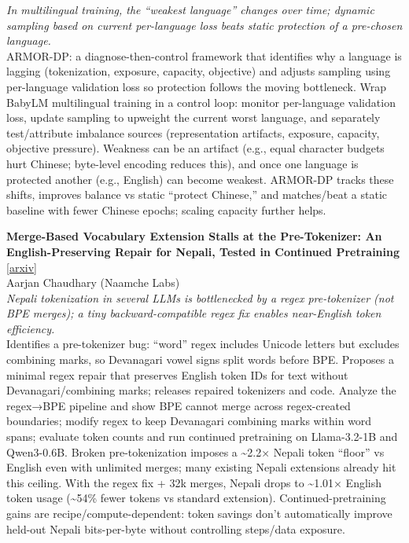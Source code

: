 \documentclass[12pt,letterpaper]{article}
\begin{document}
{\small\textit{In multilingual training, the ``weakest language'' changes over time; dynamic sampling based on current per-language loss beats static protection of a pre-chosen language.}}\\[1pt]
{\footnotesize ARMOR-DP: a diagnose-then-control framework that identifies why a language is lagging (tokenization, exposure, capacity, objective) and adjusts sampling using per-language validation loss so protection follows the moving bottleneck. Wrap BabyLM multilingual training in a control loop: monitor per-language validation loss, update sampling to upweight the current worst language, and separately test/attribute imbalance sources (representation artifacts, exposure, capacity, objective pressure). Weakness can be an artifact (e.g., equal character budgets hurt Chinese; byte-level encoding reduces this), and once one language is protected another (e.g., English) can become weakest. ARMOR-DP tracks these shifts, improves balance vs static ``protect Chinese,'' and matches/beat a static baseline with fewer Chinese epochs; scaling capacity further helps.}

\medskip

{\small\textbf{Merge-Based Vocabulary Extension Stalls at the Pre-Tokenizer: An English-Preserving Repair for Nepali, Tested in Continued Pretraining}} {\scriptsize[\href{https://arxiv.org/abs/2610.33016}{arxiv}]}\\
{\scriptsize Aarjan Chaudhary (Naamche Labs)}\\

{\small\textit{Nepali tokenization in several LLMs is bottlenecked by a regex pre-tokenizer (not BPE merges); a tiny backward-compatible regex fix enables near-English token efficiency.}}\\[1pt]
{\footnotesize Identifies a pre-tokenizer bug: ``word'' regex includes Unicode letters but excludes combining marks, so Devanagari vowel signs split words before BPE. Proposes a minimal regex repair that preserves English token IDs for text without Devanagari/combining marks; releases repaired tokenizers and code. Analyze the regex→BPE pipeline and show BPE cannot merge across regex-created boundaries; modify regex to keep Devanagari combining marks within word spans; evaluate token counts and run continued pretraining on Llama-3.2-1B and Qwen3-0.6B. Broken pre-tokenization imposes a \textasciitilde{}2.2× Nepali token ``floor'' vs English even with unlimited merges; many existing Nepali extensions already hit this ceiling. With the regex fix + 32k merges, Nepali drops to \textasciitilde{}1.01× English token usage (\textasciitilde{}54\% fewer tokens vs standard extension). Continued-pretraining gains are recipe/compute-dependent: token savings don't automatically improve held-out Nepali bits-per-byte without controlling steps/data exposure.}
\end{document}
